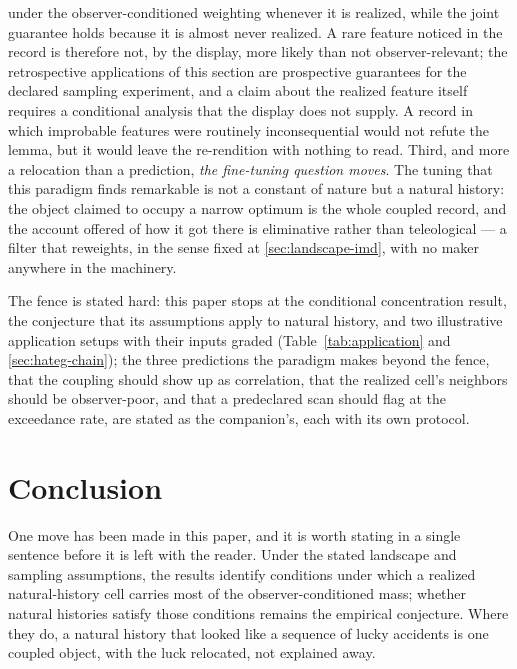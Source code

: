 \documentclass[11pt]{article}
\theoremstyle{definition}
\begin{document}
under the observer-conditioned weighting whenever it is realized, while the joint guarantee holds because it is almost never realized. A rare feature noticed in the record is therefore not, by the display, more likely than not observer-relevant; the retrospective applications of this section are prospective guarantees for the declared sampling experiment, and a claim about the realized feature itself requires a conditional analysis that the display does not supply. A record in which improbable features were routinely inconsequential would not refute the lemma, but it would leave the re-rendition with nothing to read. Third, and more a relocation than a prediction, \emph{the fine-tuning question moves}. The tuning that this paradigm finds remarkable is not a constant of nature but a natural history: the object claimed to occupy a narrow optimum is the whole coupled record, and the account offered of how it got there is eliminative rather than teleological --- a filter that reweights, in the sense fixed at \autoref{sec:landscape-imd}, with no maker anywhere in the machinery.

The fence is stated hard: this paper stops at the conditional concentration result, the conjecture that its assumptions apply to natural history, and two illustrative application setups with their inputs graded (Table~\ref{tab:application} and \autoref{sec:hateg-chain}); the three predictions the paradigm makes beyond the fence, that the coupling should show up as correlation, that the realized cell's neighbors should be observer-poor, and that a predeclared scan should flag at the exceedance rate, are stated as the companion's, each with its own protocol.

\section{Conclusion}
\label{sec:conclusion}

One move has been made in this paper, and it is worth stating in a single sentence before it is left with the reader. Under the stated landscape and sampling assumptions, the results identify conditions under which a realized natural-history cell carries most of the observer-conditioned mass; whether natural histories satisfy those conditions remains the empirical conjecture. Where they do, a natural history that looked like a sequence of lucky accidents is one coupled object, with the luck relocated, not explained away.
\end{document}
